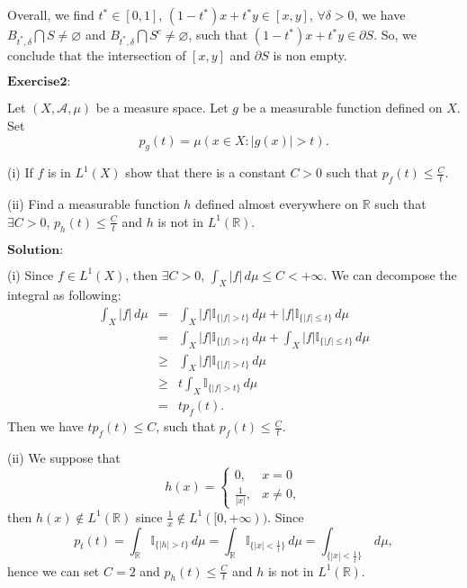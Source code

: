 \documentclass[12pt,a4paper]{ctexart}
\begin{document}
Overall, we find $t^{*} \in [0, 1]$, $(1- t^{*})x + t^{*} y \in [x, y]$, $\forall \delta > 0$, we have $B_{t^{*}, \delta} \bigcap S \neq \varnothing$ and $B_{t^{*}, \delta} \bigcap S^{c} \neq \varnothing$, such that $(1- t^{*})x + t^{*} y \in \partial{S}$. So, we conclude that the intersection of $[x, y]$ and $\partial S$ is non empty.

\vspace{8pt}
$\textbf{Exercise2:}$

Let $(X, \mathcal{A}, \mu)$ be a measure space. Let $g$ be a measurable function defined on $X$. Set 
\begin{equation*}
    p_{g} (t) = \mu ({x \in X : |g(x)| > t}).
\end{equation*}

(i) If $f$ is in $L^{1}(X)$ show that there is a constant $C > 0$ such that $p_{f}(t) \leq \frac{C}{t}$.

(ii) Find a measurable function $h$ defined almost everywhere on $\mathbb{R}$ such that $\exists C > 0$, $p_{h} (t) \leq \frac{C}{t}$ and $h$ is not in $L^{1}(\mathbb{R})$.

\vspace{8pt}
$\textbf{Solution:}$

(i) Since $f \in L^{1}(X)$, then $\exists C > 0$, $\int_{X}^{} |f| \, d \mu \leq C < + \infty$. We can decompose the integral as following:
\begin{eqnarray*}
\int_{X}^{} |f| \, d \mu &=& \int_{X}^{} |f| \mathbb{I}_{\{|f| > t\}} \, d \mu + |f| \mathbb{I}_{\{|f| \leq t\}} \, d \mu  \\
            &=& \int_{X}^{} |f| \mathbb{I}_{\{|f| > t\}} \, d \mu + \int_{X}^{} |f| \mathbb{I}_{\{|f| \leq t\}} \, d \mu  \\
            &\geq & \int_{X}^{} |f| \mathbb{I}_{\{|f| > t\}} \, d \mu  \\
            & \geq & t \int_{X}^{} \mathbb{I}_{\{|f| > t\}} \, d \mu \\
            & = & t p_{f}(t).
\end{eqnarray*}
Then we have $t p_{f}(t) \leq C$, such that $p_{f}(t) \leq \frac{C}{t}$.

(ii) We suppose that 
\begin{equation*}
h(x) =
\left\{
             \begin{array}{cl}
             0, & x = 0 \\
             \frac{1}{|x|}, & x \neq 0,
             \end{array}
\right.
\end{equation*}
then $h(x) \notin L^{1}(\mathbb{R})$ since $\frac{1}{x} \notin L^{1}([0, + \infty))$. Since
\begin{equation*}
p_{t}(t) = \int_{\mathbb{R}}^{} \mathbb{I}_{\{|h| > t\}} \, d \mu  = \int_{\mathbb{R}}^{} \mathbb{I}_{\{|x| < \frac{1}{t} \}} \, d \mu  =  \int_{\{|x| < \frac{1}{t} \}}^{} \, d \mu,
\end{equation*}
hence we can set $C = 2$ and $p_{h} (t) \leq \frac{C}{t}$ and $h$ is not in $L^{1}(\mathbb{R})$.
\end{document}
